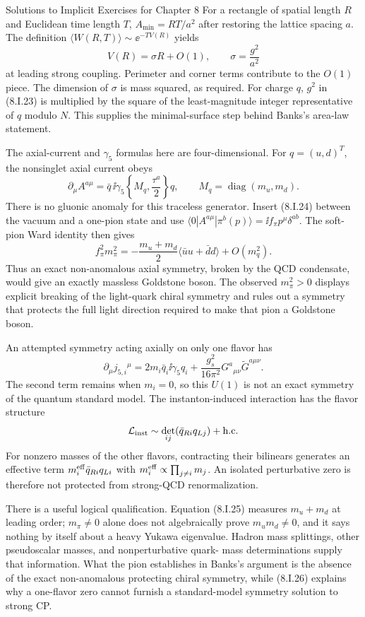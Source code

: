 \begin{bankssolutions}{Solutions to Implicit Exercises for Chapter 8}
For a rectangle of spatial length $R$ and Euclidean time length $T$,
$A_{\min}=RT/a^2$ after restoring the lattice spacing $a$.  The definition
$\langle W(R,T)\rangle\sim\ee^{-TV(R)}$ yields
\[
 V(R)=\sigma R+O(1),
 \qquad \sigma=\frac{g^2}{a^2} \tag{8.I.23}
\]
at leading strong coupling.  Perimeter and corner terms contribute to the
$O(1)$ piece.  The dimension of $\sigma$ is mass squared, as required.  For
charge $q$, $g^2$ in (8.I.23) is multiplied by the square of the least-magnitude
integer representative of $q$ modulo $N$.  This supplies the minimal-surface
step behind Banks's area-law statement.

The axial-current and $\gamma_5$ formulas here are four-dimensional.
For $q=(u,d)^T$, the nonsinglet axial current obeys
\[
 \partial_\mu A^{a\mu}
 =\bar q\,\ii\gamma_5\left\{M_q,\frac{\tau^a}{2}\right\}q,
 \qquad M_q=\operatorname{diag}(m_u,m_d). \tag{8.I.24}
\]
There is no gluonic anomaly for this traceless generator.  Insert (8.I.24)
between the vacuum and a one-pion state and use
$\langle0|A^{a\mu}|\pi^b(p)\rangle=\ii f_\pi p^\mu\delta^{ab}$.
The soft-pion Ward identity then gives
\[
 f_\pi^2m_\pi^2
 =-\frac{m_u+m_d}{2}
 \langle\bar uu+\bar dd\rangle+O(m_q^2). \tag{8.I.25}
\]
Thus an exact non-anomalous axial symmetry, broken by the QCD condensate,
would give an exactly massless Goldstone boson.  The observed
$m_\pi^2>0$ displays explicit breaking of the light-quark chiral symmetry and
rules out a symmetry that protects the full light direction required to make
that pion a Goldstone boson.

An attempted symmetry acting axially on only one flavor has
\[
 \partial_\mu j_{5,i}{}^\mu
 =2m_i\bar q_i\ii\gamma_5q_i
 +\frac{g_s^2}{16\pi^2}G^a{}_{\mu\nu}\widetilde G^{a\mu\nu}. \tag{8.I.26}
\]
The second term remains when $m_i=0$, so this $U(1)$ is not an exact symmetry
of the quantum standard model.  The instanton-induced interaction has the
flavor structure
\[
 \mathcal L_{\rm inst}\sim
 \det_{ij}(\bar q_{Ri}q_{Lj})+\mathrm{h.c.}
\]
For nonzero masses of the other flavors, contracting their bilinears generates
an effective term $m_i^{\rm eff}\bar q_{Ri}q_{Li}$ with
$m_i^{\rm eff}\propto\prod_{j\ne i}m_j$.  An isolated perturbative zero is
therefore not protected from strong-QCD renormalization.

There is a useful logical qualification.  Equation (8.I.25) measures
$m_u+m_d$ at leading order; $m_\pi\ne0$ alone does not algebraically prove
$m_um_d\ne0$, and it says nothing by itself about a heavy Yukawa eigenvalue.
Hadron mass splittings, other pseudoscalar masses, and nonperturbative quark-
mass determinations supply that information.  What the pion establishes in
Banks's argument is the absence of the exact non-anomalous protecting chiral
symmetry, while (8.I.26) explains why a one-flavor zero cannot furnish a
standard-model symmetry solution to strong CP.


\end{bankssolutions}
